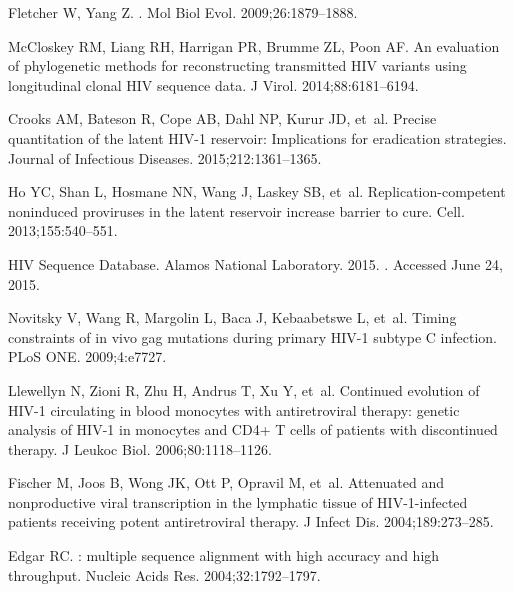 \documentclass{bmcart}
\begin{document}
\begin{backmatter}
\begin{thebibliography}{10}
Fletcher W, Yang Z.
.
\newblock Mol Biol Evol. 2009;\hspace{0pt}26:1879--1888.

McCloskey RM, Liang RH, Harrigan PR, Brumme ZL, Poon AF.
\newblock An evaluation of phylogenetic methods for reconstructing transmitted
  {HIV} variants using longitudinal clonal {HIV} sequence data.
\newblock J Virol. 2014;\hspace{0pt}88:6181--6194.

Crooks AM, Bateson R, Cope AB, Dahl NP, Kurur JD, et~al.
\newblock Precise quantitation of the latent {HIV-1} reservoir: Implications
  for eradication strategies.
\newblock Journal of Infectious Diseases. 2015;\hspace{0pt}212:1361--1365.

Ho YC, Shan L, Hosmane NN, Wang J, Laskey SB, et~al.
\newblock Replication-competent noninduced proviruses in the latent reservoir
  increase barrier to cure.
\newblock Cell. 2013;\hspace{0pt}155:540--551.

{HIV Sequence Database}.
 {Alamos} {National} {Laboratory}. 2015.
. Accessed June 24, 2015.

Novitsky V, Wang R, Margolin L, Baca J, Kebaabetswe L, et~al.
\newblock Timing constraints of in vivo gag mutations during primary {HIV-1}
  subtype {C} infection.
\newblock PLoS ONE. 2009;\hspace{0pt}4:e7727.

Llewellyn N, Zioni R, Zhu H, Andrus T, Xu Y, et~al.
\newblock Continued evolution of {HIV-1} circulating in blood monocytes with
  antiretroviral therapy: genetic analysis of {HIV-1} in monocytes and {CD4+}
  {T} cells of patients with discontinued therapy.
\newblock J Leukoc Biol. 2006;\hspace{0pt}80:1118--1126.

Fischer M, Joos B, Wong JK, Ott P, Opravil M, et~al.
\newblock Attenuated and nonproductive viral transcription in the lymphatic
  tissue of {HIV-1-infected} patients receiving potent antiretroviral therapy.
\newblock J Infect Dis. 2004;\hspace{0pt}189:273--285.

Edgar RC.
: multiple sequence alignment with high accuracy and high
  throughput.
\newblock Nucleic Acids Res. 2004;\hspace{0pt}32:1792--1797.


\end{thebibliography}
\end{backmatter}
\end{document}
